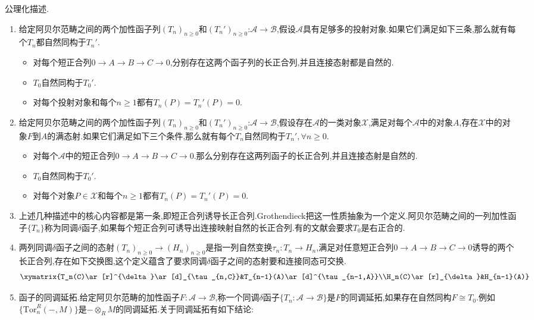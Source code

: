 公理化描述.
\begin{enumerate}
	\item 给定阿贝尔范畴之间的两个加性函子列$(T_n)_{n\ge0}$和$(T_n')_{n\ge0}$:$\mathscr{A}\to\mathscr{B}$,假设$\mathscr{A}$具有足够多的投射对象.如果它们满足如下三条,那么就有每个$T_n$都自然同构于$T_n'$.
	\begin{itemize}
		\item 对每个短正合列$0\to A\to B\to C\to0$,分别存在这两个函子列的长正合列,并且连接态射都是自然的.
		\item $T_0$自然同构于$T_0'$.
		\item 对每个投射对象和每个$n\ge1$都有$T_n(P)=T_n'(P)=0$.
	\end{itemize}
    \item 给定阿贝尔范畴之间的两个加性函子列$(T_n)_{n\ge0}$和$(T_n')_{n\ge0}$:$\mathscr{A}\to\mathscr{B}$,假设存在$\mathscr{A}$的一类对象$\mathscr{X}$,满足对每个$\mathscr{A}$中的对象$A$,存在$\mathscr{X}$中的对象$F$到$A$的满态射.如果它们满足如下三个条件,那么就有每个$T_n$自然同构于$T_n',\forall n\ge0$.
    \begin{itemize}
    	\item 对每个$\mathscr{A}$中的短正合列$0\to A\to B\to C\to0$.那么分别存在这两列函子的长正合列,并且连接态射是自然的.
    	\item $T_0$自然同构于$T_0'$.
    	\item 对每个对象$P\in\mathscr{X}$和每个$n\ge1$都有$T_n(P)=T_n'(P)=0$.
    \end{itemize}
    \item 上述几种描述中的核心内容都是第一条,即短正合列诱导长正合列.Grothendieck把这一性质抽象为一个定义.阿贝尔范畴之间的一列加性函子$\{T_n\}$称为同调$\delta$函子,如果每个短正合列可诱导出连接映射自然的长正合列.有的文献会要求$T_0$是右正合的.
    \item 两列同调$\delta$函子之间的态射$(T_n)_{n\ge0}\to(H_n)_{n\ge0}$是指一列自然变换$\tau_n:T_n\to H_n$,满足对任意短正合列$0\to A\to B\to C\to0$诱导的两个长正合列,存在如下交换图,这个定义蕴含了要求同调$\delta$函子之间的态射要和连接同态可交换.
    $$\xymatrix{T_n(C)\ar[r]^{\delta}\ar[d]_{\tau_{n,C}}&T_{n-1}(A)\ar[d]^{\tau_{n-1,A}}\\H_n(C)\ar[r]_{\delta}&H_{n-1}(A)}$$
    \item 函子的同调延拓.给定阿贝尔范畴的加性函子$F:\mathscr{A}\to\mathscr{B}$,称一个同调$\delta$函子$\{T_n:\mathscr{A}\to\mathscr{B}\}$是$F$的同调延拓,如果存在自然同构$F\cong T_0$.例如$\{\mathrm{Tor}_n^R(-,M)\}$是$-\otimes_RM$的同调延拓.关于同调延拓有如下结论:
    \begin{enumerate}

\end{enumerate}
\end{enumerate}
